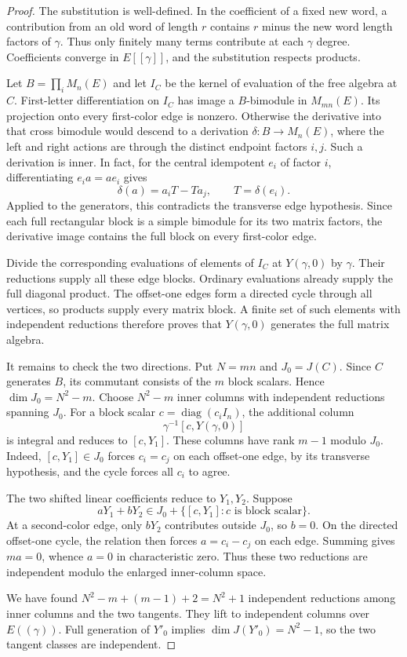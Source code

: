 \begin{proof}
The substitution is well-defined.  In the coefficient of a fixed
new word, a contribution from an old word of length $r$ contains
$r$ minus the new word length factors of $\gamma$.  Thus only
finitely many terms contribute at each $\gamma$ degree.  Coefficients
converge in $E[[\gamma]]$, and the substitution respects products.

Let $B=\prod_iM_n(E)$ and let $I_C$ be the kernel of evaluation of
the free algebra at $C$.  First-letter differentiation on $I_C$
has image a $B$-bimodule in $M_{mn}(E)$.  Its projection onto every
first-color edge is nonzero.  Otherwise the derivative into that
cross bimodule would descend to a derivation $\delta:B\to M_n(E)$,
where the left and right actions are through the distinct endpoint
factors $i,j$.  Such a derivation is inner.  In fact, for the central
idempotent $e_i$ of factor $i$, differentiating $e_i a=a e_i$ gives
\[
 \delta(a)=a_iT-Ta_j,\qquad T=\delta(e_i).
\]
Applied to the generators, this contradicts the transverse edge
hypothesis.  Since each full rectangular block is a simple bimodule
for its two matrix factors, the derivative image contains the full
block on every first-color edge.

Divide the corresponding evaluations of elements of $I_C$ at
$Y(\gamma,0)$ by $\gamma$.  Their reductions supply all these edge
blocks.  Ordinary evaluations already supply the full diagonal
product.  The offset-one edges form a directed cycle through all
vertices, so products supply every matrix block.  A finite set of
such elements with independent reductions therefore proves that
$Y(\gamma,0)$ generates the full matrix algebra.

It remains to check the two directions.  Put $N=mn$ and
$J_0=J(C)$.  Since $C$ generates $B$, its commutant consists of the
$m$ block scalars.  Hence $\dim J_0=N^2-m$.  Choose $N^2-m$ inner
columns with independent reductions spanning $J_0$.  For a block
scalar $c=\operatorname{diag}(c_i I_n)$, the additional column
\[
 \gamma^{-1}[c,Y(\gamma,0)]
\]
is integral and reduces to $[c,Y_1]$.  These columns have rank
$m-1$ modulo $J_0$.  Indeed, $[c,Y_1]\in J_0$ forces $c_i=c_j$
on each offset-one edge, by its transverse hypothesis, and the
cycle forces all $c_i$ to agree.

The two shifted linear coefficients reduce to $Y_1,Y_2$.  Suppose
\[
 aY_1+bY_2\in J_0+\{[c,Y_1]:c\text{ is block scalar}\}.
\]
At a second-color edge, only $bY_2$ contributes outside $J_0$,
so $b=0$.  On the directed offset-one cycle, the relation then
forces $a=c_i-c_j$ on each edge.  Summing gives $ma=0$, whence
$a=0$ in characteristic zero.  Thus these two reductions are
independent modulo the enlarged inner-column space.

We have found $N^2-m+(m-1)+2=N^2+1$ independent reductions among
inner columns and the two tangents.  They lift to independent
columns over $E((\gamma))$.  Full generation of $Y'_0$ implies
$\dim J(Y'_0)=N^2-1$, so the two tangent classes are independent.
\end{proof}

